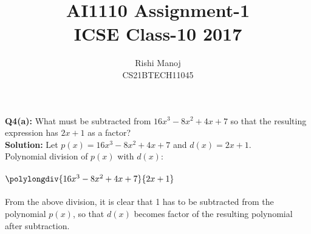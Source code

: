 \documentclass[journal,12pt,twocolumn]{IEEEtran}
\title{AI1110 Assignment-1\\ICSE Class-10 2017}
\author{Rishi Manoj\\CS21BTECH11045}
\begin{document}
\maketitle
\textbf{Q4(a):}
What must be subtracted from $16x^3-8x^2+4x+7$ so that the resulting expression has $2x+1$ as a factor?\\
\textbf{Solution:}
Let $p(x)=16x^3-8x^2+4x+7$ and $d(x)=2x+1$.\\
Polynomial division of $p(x)$ with $d(x)$:\\
\\
$\polylongdiv{16x^3-8x^2+4x+7}{2x+1}$
\\
\\
From the above division, it is clear that 1 has to be subtracted from the polynomial $p(x)$, so that $d(x)$ becomes factor of the resulting polynomial after subtraction.
\end{document}
